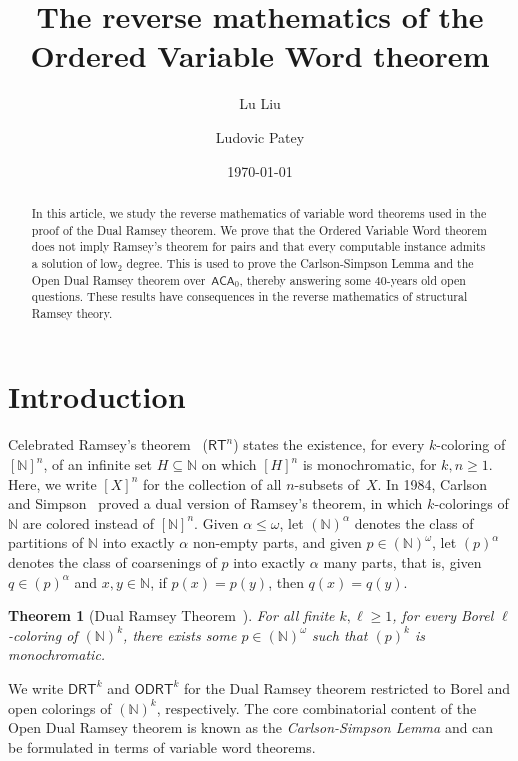 \documentclass{article}
\title{The reverse mathematics of the Ordered Variable Word theorem}
\date{\today}
\author{Lu Liu \and Ludovic Patey}
\newcommand{\ACA}[0]{\mathsf{ACA}}
\newcommand{\RT}[0]{\mathsf{RT}}
\newcommand{\DRT}[0]{\mathsf{DRT}}
\newcommand{\ODRT}[0]{\mathsf{ODRT}}
\newcommand{\NN}[0]{\mathbb{N}}
\newtheorem{theorem}{Theorem}
\numberwithin{theorem}{section}
\theoremstyle{definition}
\begin{document}
\maketitle

\begin{abstract}
In this article, we study the reverse mathematics of variable word theorems used in the proof of the Dual Ramsey theorem. We prove that the Ordered Variable Word theorem does not imply Ramsey's theorem for pairs and that every computable instance admits a solution of low${}_2$ degree. This is used to prove the Carlson-Simpson Lemma and the Open Dual Ramsey theorem over~$\ACA_0$, thereby answering some 40-years old open questions. These results have consequences in the reverse mathematics of structural Ramsey theory.
\end{abstract}

\section{Introduction}

Celebrated Ramsey's theorem~\cite{ramsey1929problem} ($\RT^n$) states the existence, for every $k$-coloring of $[\NN]^n$,
of an infinite set $H \subseteq \NN$ on which $[H]^n$ is monochromatic, for $k, n \geq 1$. Here, we write $[X]^n$ for the collection of all $n$-subsets of~$X$. In 1984, Carlson and Simpson~\cite{carlson1984dual} proved a dual version of Ramsey's theorem, in which $k$-colorings of $\NN$ are colored instead of $[\NN]^n$.
Given $\alpha \leq \omega$, let $(\NN)^\alpha$ denotes the class of partitions of $\NN$ into exactly $\alpha$ non-empty parts, and given $p \in (\NN)^\omega$, let $(p)^\alpha$ denotes the class of coarsenings of $p$ into exactly $\alpha$ many parts, that is, given $q \in (p)^\alpha$ and $x, y \in \NN$, if $p(x) = p(y)$, then $q(x) = q(y)$.

\begin{theorem}[Dual Ramsey Theorem~\cite{carlson1984dual}]
For all finite $k, \ell \geq 1$, for every Borel $\ell$-coloring of $(\NN)^k$,
there exists some $p \in (\NN)^\omega$ such that $(p)^k$ is monochromatic.
\end{theorem}

We write $\DRT^k$ and $\ODRT^k$ for the Dual Ramsey theorem restricted to Borel and open colorings of $(\NN)^k$, respectively. The core combinatorial content of the Open Dual Ramsey theorem is known as the \emph{Carlson-Simpson Lemma} and can be formulated in terms of variable word theorems.
\end{document}
